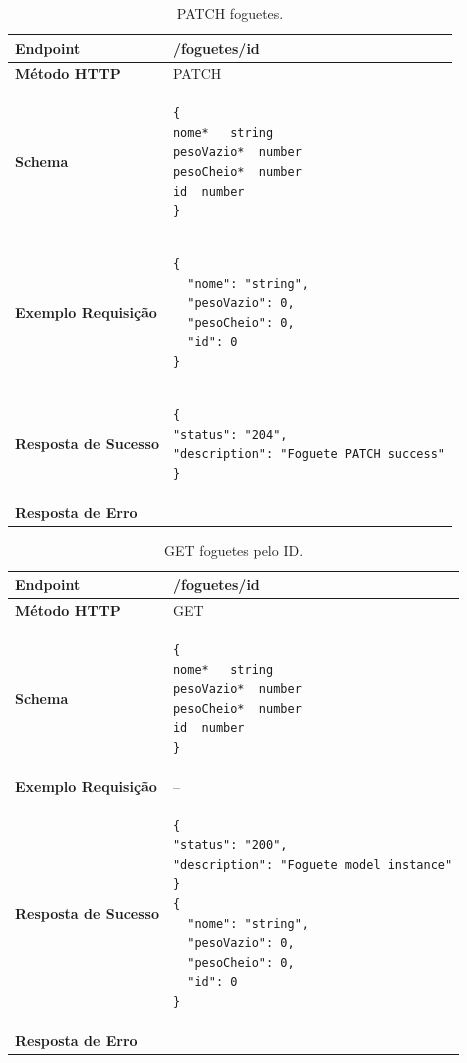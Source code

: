 \begin{apendicesenv}
\begin{table}[H]
\begin{tabular}{|l|l|}
\hline
\textbf{Endpoint}            & /foguetes/{id} \\ \hline
\textbf{Método HTTP}         & PATCH \\ \hline
\textbf{Schema}              &  
\begin{lstlisting}
{
nome*	string
pesoVazio*	number
pesoCheio*	number
id	number
}
\end{lstlisting}\\ \hline
\textbf{Exemplo Requisição}  &  
\begin{lstlisting}
{
  "nome": "string",
  "pesoVazio": 0,
  "pesoCheio": 0,
  "id": 0
}
\end{lstlisting}
\\ \hline
\textbf{Resposta de Sucesso} &
\begin{lstlisting}
{
"status": "204",
"description": "Foguete PATCH success"
}
\end{lstlisting}
\\ \hline
\textbf{Resposta de Erro}    &  \\ \hline
\end{tabular}
\caption{PATCH foguetes.}
\label{patch_foguetes}
\end{table}

\begin{table}[H]
\begin{tabular}{|l|l|}
\hline
\textbf{Endpoint}            & /foguetes/{id} \\ \hline
\textbf{Método HTTP}         & GET \\ \hline
\textbf{Schema}              &  
\begin{lstlisting}
{
nome*	string
pesoVazio*	number
pesoCheio*	number
id	number
}
\end{lstlisting}\\ \hline
\textbf{Exemplo Requisição}  &  -- \\ \hline
\textbf{Resposta de Sucesso} &
\begin{lstlisting}
{
"status": "200",
"description": "Foguete model instance"
}
{
  "nome": "string",
  "pesoVazio": 0,
  "pesoCheio": 0,
  "id": 0
}
\end{lstlisting}
\\ \hline
\textbf{Resposta de Erro}    &  \\ \hline
\end{tabular}
\caption{GET foguetes pelo ID.}
\label{get_foguetes_id}
\end{table}


\end{apendicesenv}

